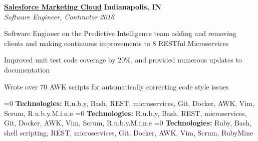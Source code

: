 %
    \headerrow
        {\textbf{\href{https://www.marketingcloud.com/}{Salesforce Marketing Cloud}}}
        {\textbf{Indianapolis, IN}}
    \\
    \headerrow
        {\emph{Software Engineer, Contractor}}
        {\emph{2016}}
    \begin{itemize*}
        \item Software Engineer on the Predictive Intelligence team adding and removing clients
            and making continuous improvements to 8 RESTful Microservices
        \item Improved unit test code coverage by 20\%, and provided numerous updates to documentation
        \item Wrote over 70 AWK scripts for automatically correcting code style issues
    \end{itemize*}

    \ifnum{}=0
        \hspace{1.0em}
        {\textbf{Technologies:} R.u.b.y, Bash, REST, microservices, Git, Docker, AWK, Vim, Scrum, R.u.b.y.M.i.n.e}
    \fi
    \ifnum{}=0
        \hspace{1.0em}
        {\textbf{Technologies:} R.u.b.y, Bash, REST, microservices, Git, Docker, AWK, Vim, Scrum, R.u.b.y.M.i.n.e}
    \fi
    \ifnum{}=0
        \hspace{1.0em}
        {\textbf{Technologies:} Ruby, Bash, shell scripting, REST, microservices, Git, Docker, AWK, Vim, Scrum, RubyMine}
    \fi
